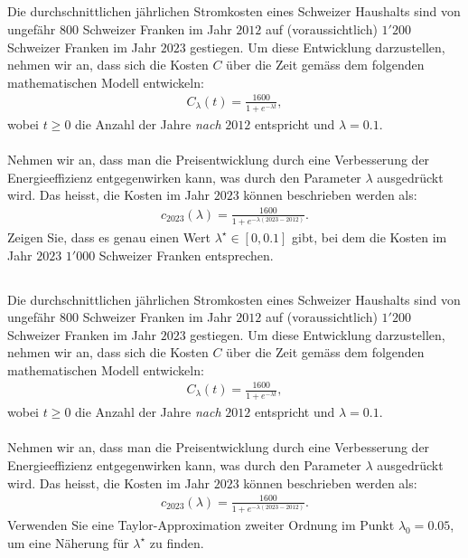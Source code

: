 \subsection*{} 
Die durchschnittlichen jährlichen Stromkosten eines Schweizer Haushalts sind von ungefähr $800$ Schweizer Franken im Jahr $2012$ auf (voraussichtlich) $1'200$ Schweizer Franken im Jahr $2023$ gestiegen. Um diese Entwicklung darzustellen, nehmen wir an, dass sich die Kosten $C$ über die Zeit gemäss dem folgenden mathematischen Modell entwickeln:
\begin{align*}
	C_\lambda(t)
	=
	\frac{1600}{1 + e^{-\lambda t}},
\end{align*}
wobei $t \geq 0$ die Anzahl der Jahre \textit{nach} $2012$ entspricht und $\lambda = 0.1$.
\\
\\
Nehmen wir an, dass man die Preisentwicklung durch eine Verbesserung der Energieeffizienz entgegenwirken kann, was durch den Parameter $\lambda$ ausgedrückt wird. Das heisst, die Kosten im Jahr $2023$ können beschrieben werden als:
\begin{align*}
	c_{2023}(\lambda) 
	=
	\frac{1600}{1 + e^{- \lambda (2023 - 2012)}}.
\end{align*}
Zeigen Sie, dass es genau einen Wert $\lambda^\star \in [0,0.1]$ gibt, bei dem die Kosten im Jahr $2023$ $1'000$ Schweizer Franken entsprechen.

\subsection*{}
Die durchschnittlichen jährlichen Stromkosten eines Schweizer Haushalts sind von ungefähr $800$ Schweizer Franken im Jahr $2012$ auf (voraussichtlich) $1'200$ Schweizer Franken im Jahr $2023$ gestiegen. Um diese Entwicklung darzustellen, nehmen wir an, dass sich die Kosten $C$ über die Zeit gemäss dem folgenden mathematischen Modell entwickeln:
\begin{align*}
	C_\lambda(t)
	=
	\frac{1600}{1 + e^{-\lambda t}},
\end{align*}
wobei $t \geq 0$ die Anzahl der Jahre \textit{nach} $2012$ entspricht und $\lambda = 0.1$.
\\
\\
Nehmen wir an, dass man die Preisentwicklung durch eine Verbesserung der Energieeffizienz entgegenwirken kann, was durch den Parameter $\lambda$ ausgedrückt wird. Das heisst, die Kosten im Jahr $2023$ können beschrieben werden als:
\begin{align*}
	c_{2023}(\lambda) 
	=
	\frac{1600}{1 + e^{- \lambda (2023 - 2012)}}.
\end{align*}
Verwenden Sie eine Taylor-Approximation zweiter Ordnung im Punkt $ \lambda_0 = 0.05 $, um eine Näherung für $ \lambda^\star $ zu finden.
 \\
\\
\titleformat{\subsection}[display]
{\normalfont\large\bfseries}{\thesubsection}{1mm}{}
